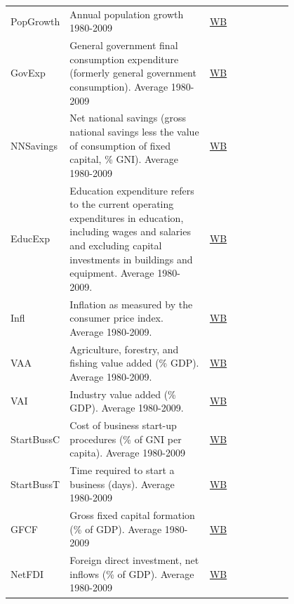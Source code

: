 \documentclass[a4paper,11pt]{article}
\begin{document}
\begin{center}
\begin{longtable}{l p{0.50\linewidth} p{0.3\linewidth}}
  PopGrowth & Annual population growth 1980-2009 & \href{http://data.worldbank.org/indicator/SP.POP.GROW}{WB} \\

  GovExp & General government final consumption expenditure (formerly general government consumption). Average 1980-2009 & \href{http://data.worldbank.org/indicator/NE.CON.GOVT.ZS}{WB}\\

  NNSavings & Net national savings (gross national savings less the value of consumption of fixed capital, \% GNI). Average 1980-2009 & \href{http://data.worldbank.org/indicator/NY.ADJ.NNAT.GN.ZS}{WB} \\

  EducExp & Education expenditure refers to the current operating expenditures in education, including wages and salaries and excluding capital investments in buildings and equipment. Average 1980-2009. & \href{http://data.worldbank.org/indicator/NY.ADJ.AEDU.GN.ZS}{WB} \\

  Infl & Inflation as measured by the consumer price index. Average 1980-2009. & \href{http://data.worldbank.org/indicator/FP.CPI.TOTL.ZG}{WB} \\

  VAA & Agriculture, forestry, and fishing value added (\% GDP). Average 1980-2009. & \href{http://data.worldbank.org/indicator/NV.AGR.TOTL.ZS}{WB} \\

  VAI & Industry value added (\% GDP). Average 1980-2009. & \href{http://data.worldbank.org/indicator/NV.IND.TOTL.ZS}{WB} \\

  StartBussC & Cost of business start-up procedures (\% of GNI per capita). Average 1980-2009 & \href{http://data.worldbank.org/indicator/IC.REG.COST.PC.ZS}{WB} \\

  StartBussT & Time required to start a business (days). Average 1980-2009 & \href{http://data.worldbank.org/indicator/IC.REG.DURS}{WB} \\

  GFCF & Gross fixed capital formation (\% of GDP). Average 1980-2009 & \href{http://data.worldbank.org/indicator/NE.GDI.FTOT.ZS}{WB} \\

  NetFDI &  Foreign direct investment, net inflows (\% of GDP). Average 1980-2009 & \href{http://data.worldbank.org/indicator/BX.KLT.DINV.WD.GD.ZS}{WB} \\


\end{longtable}
\end{center}
\end{document}
